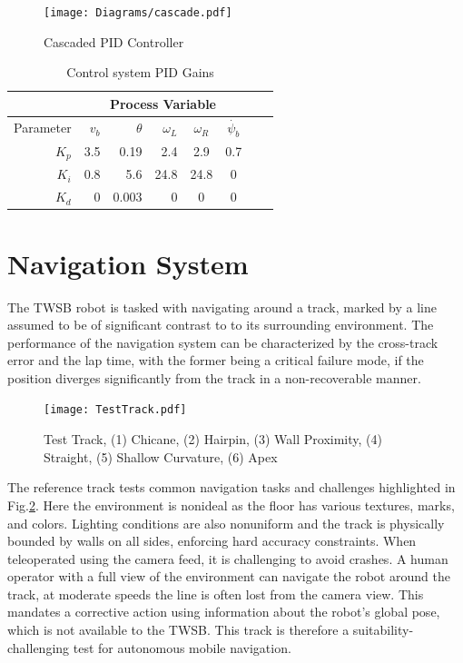         \begin{figure}[H]
            \texttt{[image: Diagrams/cascade.pdf]}
            \caption{Cascaded PID Controller}
            \label{fig:Cascade}
        \end{figure}

        \begin{table}[H]
            \centering
            \begin{tabular}{|r|r|r|r|c|c|c|c}
                \hline
                & \multicolumn{5}{c|}{Process Variable}  \\
                \hline
                Parameter & $v_b$ & $\theta$  & $\omega_L$ & $\omega_R$ & $\dot{\psi_b}$ \\
                \hline      
                $K_p$ & 3.5 & 0.19 & 2.4 & 2.9 & 0.7 \\
                $K_i$ & 0.8 & 5.6 & 24.8 & 24.8 & 0 \\
                $K_d$ & 0 & 0.003 & 0 & 0  &  0 \\
                \hline
            \end{tabular}
            \caption{Control system PID Gains}
            \label{tab:PIDGains}
        \end{table}
      
        \pagebreak{}
        \section{Navigation System}

        The TWSB robot is tasked with navigating around a track, marked by a line assumed to be of significant contrast to to its 
        surrounding environment. The performance of the navigation system can be characterized by the cross-track error and the lap time, 
        with the former being a critical failure mode, if the position diverges significantly from the track in a non-recoverable manner.

        \begin{figure}[H]
            \centering
            \texttt{[image: TestTrack.pdf]}
            \caption{Test Track, (1) Chicane, (2) Hairpin, (3) Wall Proximity, (4) Straight, (5) Shallow Curvature, (6) Apex}
            \label{fig:TestTrack}
        \end{figure}

        The reference track tests common navigation tasks and challenges highlighted in Fig.\ref{fig:TestTrack}. 
        Here the environment is nonideal as the floor has various textures, marks, and colors.
        Lighting conditions are also nonuniform and the track is physically bounded by walls on all sides, enforcing hard accuracy constraints. 
        When teleoperated using the camera feed, it is challenging to avoid crashes. A human operator with 
        a full view of the environment can navigate the robot around the track, at moderate speeds the line is often lost 
        from the camera view. This mandates a corrective action using information about the robot's global pose, 
        which is not available to the TWSB. This track is therefore a suitability-challenging test for autonomous mobile navigation.
                   
